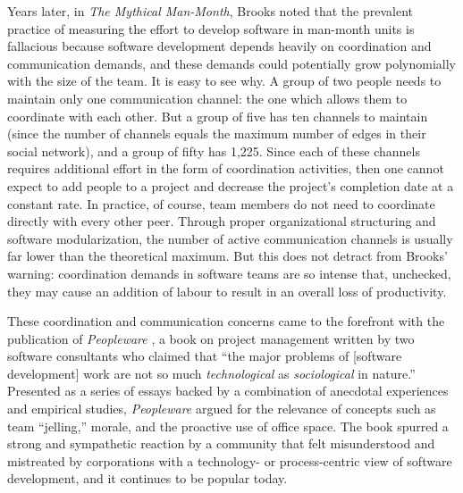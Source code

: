 Years later, in \emph{The Mythical Man-Month}, Brooks  noted that the prevalent practice of measuring the effort to develop software in man-month units is fallacious because software development depends heavily on coordination and communication demands, and these demands could potentially grow polynomially with the size of the team. It is easy to see why. A group of two people needs to maintain only one communication channel: the one which allows them to coordinate with each other. But a group of five has ten channels to maintain (since the number of channels equals the maximum number of edges in their social network), and a group of fifty has 1,225. Since each of these channels requires additional effort in the form of coordination activities, then one cannot expect to add people to a project and decrease the project's completion date at a constant rate. In practice, of course, team members do not need to coordinate directly with every other peer. Through proper organizational structuring and software modularization, the number of active communication channels is usually far lower than the theoretical maximum. But this does not detract from Brooks' warning: coordination demands in software teams are so intense that, unchecked, they may cause an addition of labour to result in an overall loss of productivity.

These coordination and communication concerns came to the forefront with the publication of \emph{Peopleware} \cite{DeMarco1987}, a book on project management written by two software consultants who claimed that ``the major problems of [software development] work are not so much \emph{technological} as \emph{sociological} in nature.'' Presented as a series of essays backed by a combination of anecdotal experiences and empirical studies, \emph{Peopleware} argued for the relevance of concepts such as team ``jelling,'' morale, and the proactive use of office space. The book spurred a strong and sympathetic reaction by a community that felt misunderstood and mistreated by corporations with a technology- or process-centric view of software development, and it continues to be popular today.


